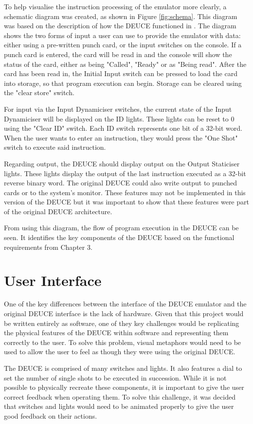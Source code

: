 \documentclass{l4proj}
\begin{document}
To help visualise the instruction processing of the emulator more clearly, a schematic diagram was created, as shown in Figure \ref{fig:schema}. This diagram was based on the description of how the DEUCE functioned in \citet{Vowels05}. The diagram shows the two forms of input a user can use to provide the emulator with data: either using a pre-written punch card, or the input switches on the console. If a punch card is entered, the card will be read in and the console will show the status of the card, either as being "Called", "Ready" or as "Being read". After the card has been read in, the Initial Input switch can be pressed to load the card into storage, so that program execution can begin. Storage can be cleared using the "clear store" switch.
	
For input via the Input Dynamiciser switches, the current state of the Input Dynamiciser will be displayed on the ID lights. These lights can be reset to 0 using the "Clear ID" switch. Each ID switch represents one bit of a 32-bit word. When the user wants to enter an instruction, they would press the "One Shot" switch to execute said instruction.
	
Regarding output, the DEUCE should display output on the Output Staticiser lights. These lights display the output of the last instruction executed as a 32-bit reverse binary word. The original DEUCE could also write output to punched cards or to the system's monitor. These features may not be implemented in this version of the DEUCE but it was important to show that these features were part of the original DEUCE architecture.

From using this diagram, the flow of program execution in the DEUCE can be seen. It identifies the key components of the DEUCE based on the functional requirements from Chapter 3.
	
\section{User Interface}
One of the key differences between the interface of the DEUCE emulator and the original DEUCE interface is the lack of hardware. Given that this project would be written entirely as software, one of they key challenges would be replicating the physical features of the DEUCE within software and representing them correctly to the user. To solve this problem, visual metaphors would need to be used to allow the user to feel as though they were using the original DEUCE.
	
The DEUCE is comprised of many switches and lights. It also features a dial to set the number of single shots to be executed in succession. While it is not possible to physically recreate these components, it is important to give the user correct feedback when operating them. To solve this challenge, it was decided that switches and lights would need to be animated properly to give the user good feedback on their actions.
	
\end{document}
